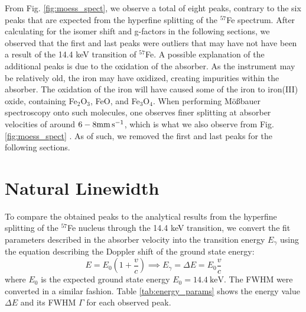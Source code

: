 \documentclass[a4paper]{report}
\numberwithin{equation}{section}
\begin{document}

From Fig. \ref{fig:moess_spect}, we observe a total of eight peaks, contrary to the 
six peaks that are expected from the hyperfine splitting of the $^{57}$Fe spectrum. After calculating for the isomer shift and 
g-factors in the following sections, we observed that the first and last peaks were outliers that may have not have been a result of  
 the 14.4 keV transition of $^{57}$Fe. 
A possible explanation of the additional peaks is due to the oxidation of the absorber. As the instrument may be relatively old,
the iron may have oxidized, creating impurities within the absorber. The oxidation of the iron will have caused some of the iron
to iron(III) oxide, containing Fe$_2$O$_3$, FeO, and Fe$_3$O$_4$. When performing M\"o{\ss}bauer spectroscopy onto such molecules, 
one observes finer splitting at absorber velocities of around $6-8\si[]{\milli\metre\per\second}$, which is what we also 
observe from Fig. \ref{fig:moess_spect} \cite{Winsett2019}. As of such, we removed the first and last peaks for the following 
sections. \par 

\section{Natural Linewidth}

To compare the obtained peaks to the analytical results from the hyperfine splitting of the $^{57}$Fe nucleus through the 14.4 keV
transition, we convert the fit parameters described in the absorber velocity into the transition energy $E_\gamma$ using the 
equation describing the Doppler shift of the ground state energy: 
\begin{equation}
    E = E_0 \left(1 + \frac{v}{c}\right) \implies E_\gamma = \Delta E = E_0\frac{v}{c}
\end{equation}
where $E_0$ is the expected ground state energy $E_0 = \SI{14.4}{\kilo\electronvolt}$. The FWHM were converted in a similar 
fashion. Table \ref{tab:energy_params} shows the energy value $\Delta E$ and its 
FWHM $\Gamma$ for each observed peak. 
\end{document}
